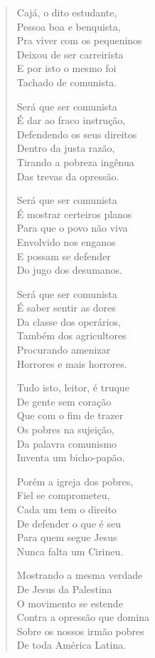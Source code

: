 \begin{verse}
Cajá, o dito estudante,\\
Pessoa boa e benquista,\\
Pra viver com os pequeninos\\
Deixou de ser carreirista\\
E por isto o mesmo foi\\
Tachado de comunista.

Será que ser comunista\\
É dar ao fraco instrução,\\
Defendendo os seus direitos\\
Dentro da justa razão,\\
Tirando a pobreza ingênua\\
Das trevas da opressão.

Será que ser comunista\\
É mostrar certeiros planos\\
Para que o povo não viva\\
Envolvido nos enganos\\
E possam se defender\\
Do jugo dos desumanos.

Será que ser comunista\\
É saber sentir as dores\\
Da classe dos operários,\\
Também dos agricultores\\
Procurando amenizar\\
Horrores e mais horrores.

Tudo isto, leitor, é truque\\
De gente sem coração\\
Que com o fim de trazer\\
Os pobres na sujeição,\\
Da palavra comunismo\\
Inventa um bicho-papão.

Porém a igreja dos pobres,\\
Fiel se comprometeu,\\
Cada um tem o direito\\
De defender o que é seu\\
Para quem segue Jesus\\
Nunca falta um Cirineu.

Mostrando a mesma verdade\\
De Jesus da Palestina\\
O movimento se estende\\
Contra a opressão que domina\\
Sobre os nossos irmão pobres\\
De toda América Latina.


\end{verse}
